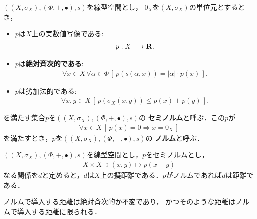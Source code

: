 	\begin{screen}
		\begin{dfn}[ノルム]
			$\left(\left(X,\sigma_X\right),(\Phi,+,\bullet),s\right)$を線型空間とし，
			$0_X$を$\left(X,\sigma_X\right)$の単位元とするとき，
			\begin{itemize}
				\item $p$は$X$上の実数値写像である:
					\begin{align}
						p:X \longrightarrow \mathbf{R}.
					\end{align}
					
				\item $p$は{\bf 絶対斉次的である}:
					\begin{align}
						\forall x \in X\, \forall \alpha \in \Phi\, 
						\left[\, p\left(s(\alpha,x)\right) = |\alpha| \cdot p(x)\, \right].
					\end{align}
					
				\item $p$は劣加法的である:
					\begin{align}
						\forall x,y \in X\, \left[\, p\left(\sigma_X\left(x,y\right)\right) 
						\leq p(x) + p(y)\, \right].
					\end{align}
			\end{itemize}
			を満たす集合$p$を$\left(\left(X,\sigma_X\right),(\Phi,+,\bullet),s\right)$の
			{\bf セミノルム}と呼ぶ．この$p$が
			\begin{align}
				\forall x \in X\, \left[\, p(x) = 0 \Longrightarrow x = 0_X\, \right]
			\end{align}
			を満たすとき，$p$を$\left(\left(X,\sigma_X\right),(\Phi,+,\bullet),s\right)$の
			{\bf ノルム}と呼ぶ．
		\end{dfn}
	\end{screen}
	
	$\left(\left(X,\sigma_X\right),(\Phi,+,\bullet),s\right)$を線型空間とし，$p$をセミノルムとし，
	\begin{align}
		X \times X \ni (x,y) \longmapsto p(x-y)
	\end{align}
	なる関係を$d$と定めると，$d$は$X$上の擬距離である．$p$がノルムであれば$d$は距離である．
	
	\begin{screen}
		\begin{thm}[絶対斉次的な不変距離はノルムで導入する距離に限られる]
			ノルムで導入する距離は絶対斉次的か不変であり，
			かつそのような距離はノルムで導入する距離に限られる．
		\end{thm}
	\end{screen}
	
